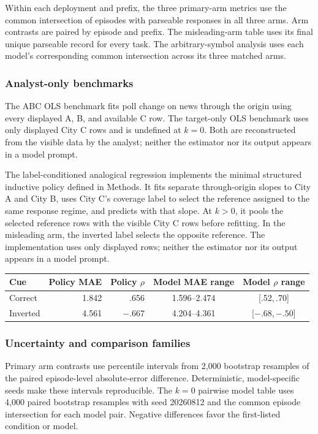 Within each deployment and prefix, the three primary-arm metrics use the common
intersection of episodes with parseable responses in all three arms. Arm
contrasts are paired by episode and prefix. The misleading-arm table uses its
final unique parseable record for every task. The arbitrary-symbol analysis uses
each model's corresponding common intersection across its three matched arms.

\subsubsection{Analyst-only benchmarks}
The ABC OLS benchmark fits poll change on news through the origin using every
displayed A, B, and available C row. The target-only OLS benchmark uses only
displayed City C rows and is undefined at \(k=0\). Both are reconstructed from
the visible data by the analyst; neither the estimator nor its output appears in
a model prompt.

The label-conditioned analogical regression implements the minimal structured
inductive policy defined in Methods. It
fits separate through-origin slopes to City A and City B, uses City C's coverage
label to select the reference assigned to the same response regime, and predicts
with that slope. At $k>0$, it pools the selected reference rows with the visible
City C rows before refitting. In the misleading arm, the inverted label selects
the opposite reference. The implementation uses only displayed rows; neither the
estimator nor its output appears in a model prompt.
\begin{center}
\begin{minipage}{\linewidth}
\centering
{}
\label{tab:coin-city-analogical}
\small
\begin{tabular}{l r r c c}
\toprule
Cue & Policy MAE & Policy $\rho$ & Model MAE range & Model $\rho$ range \\
\midrule
Correct & 1.842 & .656 & 1.596--2.474 & [.52,\,.70] \\
Inverted & 4.561 & $-.667$ & 4.204--4.361 & [$-.68$,\,$-.50$] \\
\bottomrule
\end{tabular}
\end{minipage}
\end{center}


\subsubsection{Uncertainty and comparison families}
Primary arm contrasts use percentile intervals from 2,000 bootstrap resamples of
the paired episode-level absolute-error difference. Deterministic, model-specific
seeds make these intervals reproducible. The \(k=0\) pairwise model table uses
4,000 paired bootstrap resamples with seed 20260812 and the common episode
intersection for each model pair. Negative differences favor the first-listed
condition or model.

